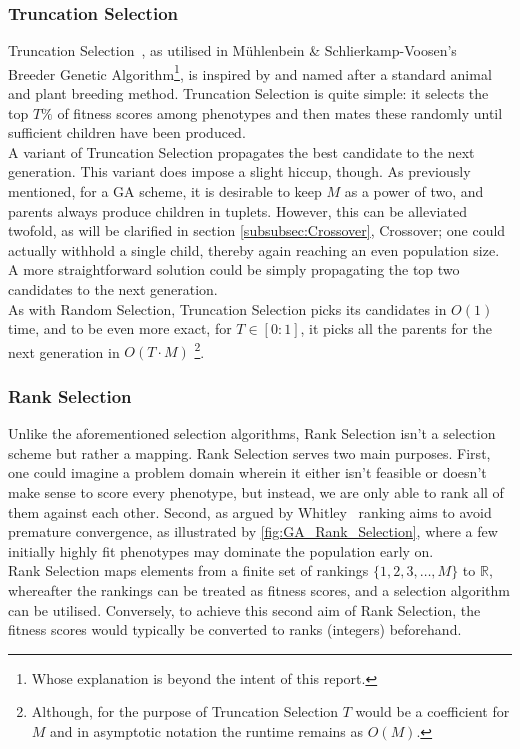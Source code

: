 \subsubsection{Truncation Selection}
Truncation Selection~\cite{Wiki-truncation-selection}, as utilised in Mühlenbein \& Schlierkamp-Voosen's~\cite{Truncation-Selection-Breeder-Algorithm} Breeder Genetic Algorithm\footnote{Whose explanation is beyond the intent of this report.}, is inspired by and named after a standard animal and plant breeding method. Truncation Selection is quite simple: it selects the top $T\%$ of fitness scores among phenotypes and then mates these randomly until sufficient children have been produced.
\\
A variant of Truncation Selection propagates the best candidate to the next generation. This variant does impose a slight hiccup, though. As previously mentioned, for a GA scheme, it is desirable to keep $M$ as a power of two, and parents always produce children in tuplets. However, this can be alleviated twofold, as will be clarified in section \ref{subsubsec:Crossover}, Crossover; one could actually withhold a single child, thereby again reaching an even population size. A more straightforward solution could be simply propagating the top two candidates to the next generation.
\\
As with Random Selection, Truncation Selection picks its candidates in $O(1)$ time, and to be even more exact, for $T \in [0:1]$, it picks all the parents for the next generation in $O(T \cdot M)$ \footnote{Although, for the purpose of Truncation Selection $T$ would be a coefficient for $M$ and in asymptotic notation the runtime remains as $O(M)$.}.

\subsubsection{Rank Selection}
Unlike the aforementioned selection algorithms, Rank Selection isn't a selection scheme but rather a mapping. Rank Selection serves two main purposes. First, one could imagine a problem domain wherein it either isn't feasible or doesn't make sense to score every phenotype, but instead, we are only able to rank all of them against each other. Second, as argued by Whitley~\cite{Rank-Selection-Usefullness} ranking aims to avoid premature convergence, as illustrated by \autoref{fig:GA_Rank_Selection}, where a few initially highly fit phenotypes may dominate the population early on.
\\
Rank Selection maps elements from a finite set of rankings $\{1, 2, 3, \hdots, M\}$ to $\mathbb{R}$, whereafter the rankings can be treated as fitness scores, and a selection algorithm can be utilised. Conversely, to achieve this second aim of Rank Selection, the fitness scores would typically be converted to ranks (integers) beforehand.

